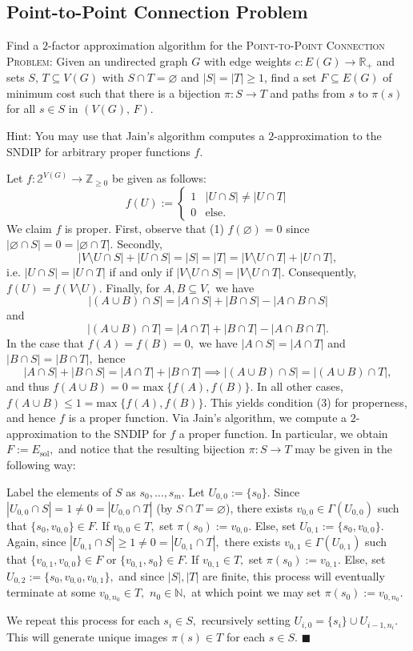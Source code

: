 \documentclass{article}
\let\emptyset\varnothing
\newcommand{\R}{\mathbb{R}}
\begin{document}
  \subsection{Point-to-Point Connection Problem}
  \begin{centerframebox}
    Find a $2$-factor approximation algorithm for the \textsc{Point-to-Point Connection Problem}:
    Given an undirected graph $G$ with edge weights $c : E(G) \to \R_+$ and sets $S,\, T \subseteq V (G)$
    with $S \cap T = \emptyset$ and $|S| = |T| \geq 1$, find a set
    $F \subseteq E(G)$ of minimum cost such that there is a bijection $\pi: S \to T$ and paths
    from $s$ to $\pi(s)$ for all $s \in S$ in $(V(G),\, F)$.

    Hint: You may use that Jain's algorithm computes a $2$-approximation to the
    SNDIP for arbitrary proper functions $f$.
  \end{centerframebox}
  Let $f:\mathbb{2}^{V(G)}\rightarrow \mathbb{Z}_{\geq 0}$ be given as follows:
  $$f(U):=\begin{cases}
      1 & |U\cap S|\neq |U\cap T|\\
      0 & \text{else.}
  \end{cases}$$
  We claim $f$ is proper. First, observe that (1) $f(\emptyset)=0$ since $|\emptyset\cap S|=0=|\emptyset\cap T|.$ Secondly, $$|V\setminus U\cap S|+|U\cap S|=|S|=|T|=|V\setminus U\cap T|+|U\cap T|,$$i.e. $|U\cap S|=|U\cap T|$ if and only if $|V\setminus U\cap S|=|V\setminus U\cap T|.$ Consequently, $f(U)=f(V\setminus U).$ Finally, for $A,B\subseteq V,$ we have $$|(A\cup B)\cap S|=|A\cap S|+|B\cap S|-|A\cap B\cap S|$$and
  $$|(A\cup B)\cap T|=|A\cap T|+|B\cap T|-|A\cap B\cap T|.$$In the case that $f(A)=f(B)=0,$ we have $|A\cap S|=|A\cap T|$ and $|B\cap S|=|B\cap T|,$ hence $$|A\cap S|+|B\cap S|=|A\cap T|+|B\cap T|\implies |(A\cup B)\cap S|=|(A\cup B)\cap T|,$$and thus $f(A\cup B)=0=\text{max}\; \{f(A),f(B)\}.$ In all other cases, $f(A\cup B)\leq 1=\text{max}\; \{f(A),f(B)\}.$ This yields condition (3) for properness, and hence $f$ is a proper function. Via Jain's algorithm, we compute a $2$-approximation to the SNDIP for $f$ a proper function. In particular, we obtain $F:=E_{\text{sol}},$ and notice that the resulting bijection $\pi:S\rightarrow T$ may be given in the following way:

  Label the elements of $S$ as $s_0,\dots, s_m.$ Let $U_{0,0}:=\{s_0\}.$ Since $|U_{0,0}\cap S|=1\neq 0=|U_{0,0}\cap T|$ (by $S\cap T=\emptyset$), there exists $v_{0,0}\in \Gamma(U_{0,0})$ such that $\{s_0,v_{0,0}\}\in F.$ If $v_{0,0}\in T,$ set $\pi(s_0):=v_{0,0}.$ Else, set $U_{0,1}:=\{s_0,v_{0,0}\}.$ Again, since $|U_{0,1}\cap S|\geq 1\neq 0=|U_{0,1}\cap T|,$ there exists $v_{0,1}\in \Gamma(U_{0,1})$ such that $\{v_{0,1},v_{0,0}\}\in F$ or $\{v_{0,1},s_0\}\in F.$ If $v_{0,1}\in T,$ set $\pi(s_0):=v_{0,1}.$ Else, set $U_{0,2}:=\{s_0,v_{0,0},v_{0,1}\},$ and since $|S|,|T|$ are finite, this process will eventually terminate at some $v_{0,n_0}\in T,$ $n_0\in \mathbb{N},$ at which point we may set $\pi(s_0):=v_{0,n_0}.$

  We repeat this process for each $s_i\in S,$ recursively setting $U_{i,0}=\{s_i\}\cup U_{i-1,n_i}.$ This will generate unique images $\pi(s)\in T$ for each $s\in S.$ $\blacksquare$
\end{document}
